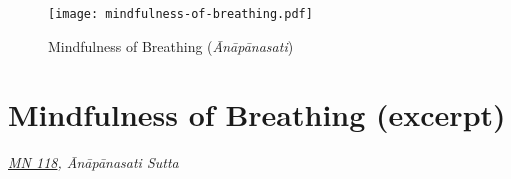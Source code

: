 \clearpage

\begin{figure}[h]
\caption{Mindfulness of Breathing (\emph{Ānāpānasati})}\label{fig-mindfulness-of-breathing}
\bigskip\centering
\texttt{[image: mindfulness-of-breathing.pdf]}
\par
\end{figure}

\clearpage

\section{Mindfulness of Breathing (excerpt)}

{\centering
\emph{\href{https://suttacentral.net/mn118}{MN 118}, Ānāpānasati Sutta}
\par}

